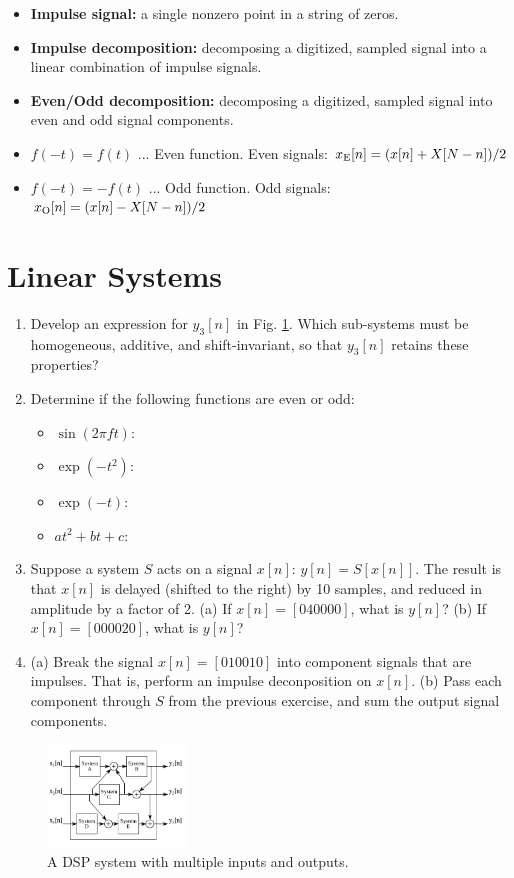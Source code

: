 \documentclass{article}
\begin{document}
\begin{itemize}
\item \textbf{Impulse signal:} a single nonzero point in a string of zeros.
\item \textbf{Impulse decomposition:} decomposing a digitized, sampled signal into a linear combination of impulse signals.
\item \textbf{Even/Odd decomposition:} decomposing a digitized, sampled signal into even and odd signal components.
\item $f(-t) = f(t)$ ... Even function.  Even signals: $x_{\rm E}[n] = (x[n] + X[N-n])/2$
\item $f(-t) = -f(t)$ ... Odd function.  Odd signals: $x_{\rm O}[n] = (x[n] - X[N-n])/2$
\end{itemize}
\normalsize

\section{Linear Systems}

\begin{enumerate}
\item Develop an expression for $y_3[n]$ in Fig. \ref{fig:1}.  Which sub-systems must be homogeneous, additive, and shift-invariant, so that $y_3[n]$ retains these properties? \\ \vspace{3cm}
\item Determine if the following functions are even or odd:
\begin{itemize}
\item $\sin(2\pi ft)$:
\item $\exp(-t^2)$:
\item $\exp(-t)$:
\item $at^2 + bt + c$:
\end{itemize} \vspace{1cm}
\item Suppose a system $S$ acts on a signal $x[n]$: $y[n] = S[x[n]]$.  The result is that $x[n]$ is delayed (shifted to the right) by 10 samples, and reduced in amplitude by a factor of 2.  (a) If $x[n] = [0 4 0 0 0 0]$, what is $y[n]$? (b) If $x[n] = [0 0 0 0 2 0]$, what is $y[n]$? \\ \vspace{3cm}
\item (a) Break the signal $x[n] = [0 1 0 0 1 0]$ into component signals that are impulses.  That is, perform an impulse deconposition on $x[n]$. (b) Pass each component through $S$ from the previous exercise, and sum the output signal components.
\end{enumerate}

\begin{figure}
\centering
\includegraphics[width=0.33\textwidth]{commute_2.png}
\caption{\label{fig:1} A DSP system with multiple inputs and outputs.}
\end{figure}
\end{document}
